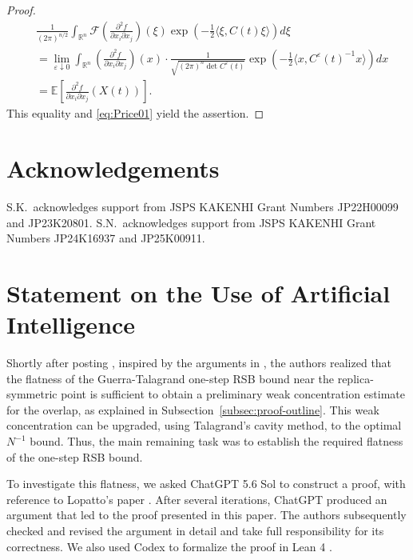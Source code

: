 \documentclass[11pt]{article}
\numberwithin{equation}{section}
\newcommand{\E}{\mathbb{E}}
\newcommand{\1}{\mathbf 1}
\begin{document}
\begin{proof}
\begin{align*}
&\frac{1}{(2\pi )^{n/2}} \int _{{\mathbb R}^n} {\mathcal F} \left( \frac{\partial ^2 f}{\partial x_i \partial x_j} \right)(\xi ) \exp \left( -\frac{1}{2} \langle \xi , C(t)\xi \rangle \right) d\xi \\
%
&= \lim _{\varepsilon \downarrow 0} \int _{{\mathbb R}^n} \left( \frac{\partial ^2 f}{\partial x_i \partial x_j} \right) (x) \cdot \frac{1}{\sqrt{(2\pi)^n \det C^\varepsilon(t)}} \exp \left( -\frac{1}{2}\langle x , C^\varepsilon (t)^{-1} x \rangle \right) dx\\
%
&= \E \left[ \frac{\partial ^2 f}{\partial x_i \partial x_j} (X(t)) \right] .
\end{align*}
This equality and \eqref{eq:Price01} yield the assertion.
\end{proof}

\section*{Acknowledgements}

S.K.\ acknowledges support from JSPS KAKENHI Grant Numbers JP22H00099 and JP23K20801.
S.N.\ acknowledges support from JSPS KAKENHI Grant Numbers JP24K16937 and JP25K00911.

\section*{Statement on the Use of Artificial Intelligence}
Shortly after posting \cite{KusuokaNakajima1}, inspired by the arguments in \cite{TalagrandParisi}, the authors realized that the flatness of the Guerra-Talagrand one-step  RSB bound near the replica-symmetric point is sufficient to obtain a preliminary weak concentration estimate for the overlap, as explained in Subsection~\ref{subsec:proof-outline}. This weak concentration can be upgraded, using Talagrand's cavity method, to the optimal $N^{-1}$ bound. Thus, the main remaining task was to establish the required flatness of the one-step RSB bound.

To investigate this flatness,  we asked ChatGPT 5.6 Sol to construct a proof, with reference to Lopatto's paper \cite{Lopatto}. After several iterations, ChatGPT produced an argument that led to the proof presented in this paper. The authors subsequently checked and revised the argument in detail and take full responsibility for its correctness. We also used Codex to formalize the proof in Lean 4 \cite{brabra}. 
\end{document}
